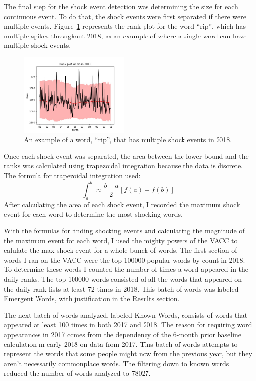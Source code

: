 \documentclass{article}
\begin{document}
The final step for the shock event detection was determining the size for
each continuous event.
To do that,
the shock events were first separated if there were multiple events.
Figure~\ref{Fig:rip} represents the rank plot for the word ``rip'',
which has multiple spikes throughout 2018,
as an example of where a single word can have multiple shock events.
\begin{figure}[ht]
    \centering
    \includegraphics[width=0.48\textwidth]{rip-2018.jpg}
    \caption{\label{Fig:rip} An example of a word, ``rip'',
that has multiple shock events in 2018.}
\end{figure}
Once each shock event was separated,
the area between the lower bound and the ranks was calculated using
trapezoidal integration because the data is discrete.
The formula for trapezoidal integration used:
\[
    \int_a^b
    \approx
    \frac{b-a}{2}
    \left[
        f(a)+f(b)
    \right]
\]
After calculating the area of each shock event,
I recorded the maximum shock event for each word to determine the most shocking
words.\par

With the formulas for finding shocking events and calculating the magnitude of
the maximum event for each word,
I used the mighty powers of the VACC to calulate the max shock event for 
a whole bunch of words.
The first section of words I ran on the VACC were the top 100000 popular words
by count in 2018.
To determine these words I counted the number of times a word appeared in the
daily ranks.
The top 100000 words consisted of all the words that appeared on the daily rank
lists at least 72 times in 2018.
This batch of words was labeled Emergent Words,
with justification in the Results section.\par

The next batch of words analyzed,
labeled Known Words,
consists of words that appeared at least 100 times in both 2017 and 2018.
The reason for requiring word appearances in 2017 comes from the dependency of
the 6-month prior baseline calculation in early 2018 on data from 2017.
This batch of words attempts to represent the words that some people might 
now from the previous year,
but they aren't necessarily commonplace words.
The filtering down to known words reduced the number of words analyzed to 
78027.\par
\end{document}
